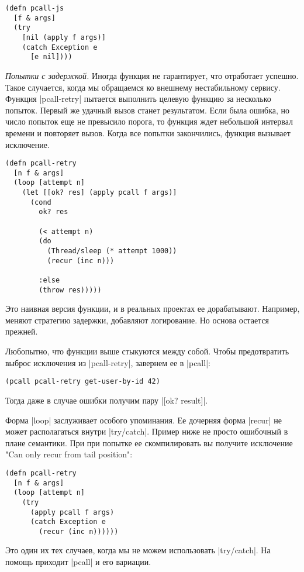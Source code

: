 \begin{verbatim}
(defn pcall-js
  [f & args]
  (try
    [nil (apply f args)]
    (catch Exception e
      [e nil])))
\end{verbatim}

\emph{Попытки с задержкой.} Иногда функция не гарантирует, что отработает
успешно. Такое случается, когда мы обращаемся ко внешнему нестабильному
сервису. Функция \spverb|pcall-retry| пытается выполнить целевую функцию за несколько
попыток. Первый же удачный вызов станет результатом. Если была ошибка, но число
попыток еще не превысило порога, то функция ждет небольшой интервал времени и
повторяет вызов. Когда все попытки закончились, функция вызывает исключение.

\begin{verbatim}
(defn pcall-retry
  [n f & args]
  (loop [attempt n]
    (let [[ok? res] (apply pcall f args)]
      (cond
        ok? res

        (< attempt n)
        (do
          (Thread/sleep (* attempt 1000))
          (recur (inc n)))

        :else
        (throw res)))))
\end{verbatim}

Это наивная версия функции, и в реальных проектах ее дорабатывают. Например,
меняют стратегию задержки, добавляют логирование. Но основа остается прежней.

Любопытно, что функции выше стыкуются между собой. Чтобы предотвратить выброс
исключения из \spverb|pcall-retry|, завернем ее в \spverb|pcall|:

\begin{verbatim}
(pcall pcall-retry get-user-by-id 42)
\end{verbatim}

Тогда даже в случае ошибки получим пару \spverb|[ok? result]|.

Форма \spverb|loop| заслуживает особого упоминания. Ее дочерняя форма \spverb|recur| не может
располагаться внутри \spverb|try/catch|. Пример ниже не просто ошибочный в плане
семантики. При при попытке ее скомпилировать вы получите исключение "Can only
recur from tail position":

\begin{verbatim}
(defn pcall-retry
  [n f & args]
  (loop [attempt n]
    (try
      (apply pcall f args)
      (catch Exception e
        (recur (inc n))))))
\end{verbatim}

Это один их тех случаев, когда мы не можем использовать \spverb|try/catch|. На помощь
приходит \spverb|pcall| и его вариации.

